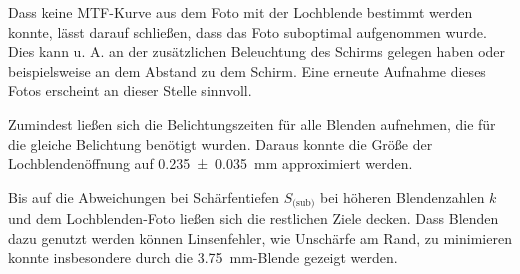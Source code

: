 	Dass keine MTF-Kurve aus dem Foto mit der Lochblende bestimmt werden konnte, lässt darauf schließen, dass das Foto suboptimal aufgenommen wurde.
	Dies kann u. A. an der zusätzlichen Beleuchtung des Schirms gelegen haben oder beispielsweise an dem Abstand zu dem Schirm.
	Eine erneute Aufnahme dieses Fotos erscheint an dieser Stelle sinnvoll.
	
	Zumindest ließen sich die Belichtungszeiten für alle Blenden aufnehmen, die für die gleiche Belichtung benötigt wurden.
	Daraus konnte die Größe der Lochblendenöffnung auf \SI{0,235+-0,035}{\milli\meter} approximiert werden.
	
	Bis auf die Abweichungen bei Schärfentiefen $S_\text{(sub)}$ bei höheren Blendenzahlen $k$ und dem Lochblenden-Foto ließen sich die restlichen Ziele decken.
	Dass Blenden dazu genutzt werden können Linsenfehler, wie Unschärfe am Rand, zu minimieren konnte insbesondere durch die \SI{3,75}{\milli\meter}-Blende gezeigt werden.